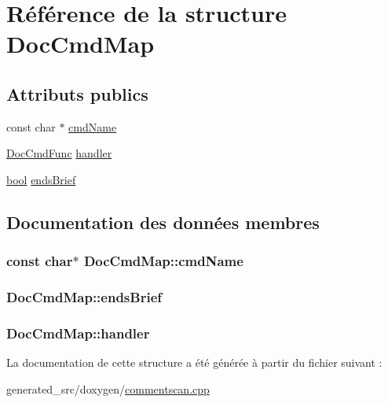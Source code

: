 \hypertarget{struct_doc_cmd_map}{}\section{Référence de la structure Doc\+Cmd\+Map}
\label{struct_doc_cmd_map}
\subsection*{Attributs publics}
\begin{DoxyCompactItemize}
\item 
const char $\ast$ \hyperlink{struct_doc_cmd_map_a37e85944ed1f5be8cec004b4686d3ed1}{cmd\+Name}
\item 
\hyperlink{commentscan_8cpp_a6eda037087f774dcb0febdb34650d56d}{Doc\+Cmd\+Func} \hyperlink{struct_doc_cmd_map_af819abbea48c5ed9c466986e97cb9c75}{handler}
\item 
\hyperlink{qglobal_8h_a1062901a7428fdd9c7f180f5e01ea056}{bool} \hyperlink{struct_doc_cmd_map_afc78de9e4a41eec7995964f08f53f440}{ends\+Brief}
\end{DoxyCompactItemize}


\subsection{Documentation des données membres}
\hypertarget{struct_doc_cmd_map_a37e85944ed1f5be8cec004b4686d3ed1}{}
\subsubsection[{cmd\+Name}]{\setlength{\rightskip}{0pt plus 5cm}const char$\ast$ Doc\+Cmd\+Map\+::cmd\+Name}\label{struct_doc_cmd_map_a37e85944ed1f5be8cec004b4686d3ed1}
\hypertarget{struct_doc_cmd_map_afc78de9e4a41eec7995964f08f53f440}{}
\subsubsection[{ends\+Brief}]{ Doc\+Cmd\+Map\+::ends\+Brief}\label{struct_doc_cmd_map_afc78de9e4a41eec7995964f08f53f440}
\hypertarget{struct_doc_cmd_map_af819abbea48c5ed9c466986e97cb9c75}{}
\subsubsection[{handler}]{ Doc\+Cmd\+Map\+::handler}\label{struct_doc_cmd_map_af819abbea48c5ed9c466986e97cb9c75}


La documentation de cette structure a été générée à partir du fichier suivant \+:\begin{DoxyCompactItemize}
\item 
generated\+\_\+src/doxygen/\hyperlink{commentscan_8cpp}{commentscan.\+cpp}\end{DoxyCompactItemize}
